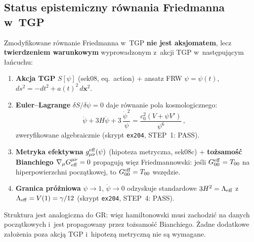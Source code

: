 \subsection{Status epistemiczny r\'ownania Friedmanna w~TGP}
\label{ssec:friedmann-status}

\begin{uwaga}
\label{rem:friedmann-conditional}
Zmodyfikowane r\'ownanie Friedmanna w~TGP \textbf{nie jest aksjomatem},
lecz \textbf{twierdzeniem warunkowym} wyprowadzonym z~akcji TGP
w~nast\k{e}puj\k{a}cym \l{}a\'ncuchu:
\begin{enumerate}[nosep]
  \item \textbf{Akcja TGP} $S[\psi]$ (sek08, eq.~action) + ansatz FRW
    $\psi = \psi(t)$, $ds^2 = -dt^2 + a(t)^2\,d\mathbf{x}^2$.
  \item \textbf{Euler--Lagrange} $\delta S/\delta\psi = 0$ daje
    r\'ownanie pola kosmologicznego:
    \begin{equation}
      \ddot\psi + 3H\dot\psi + 3\,\frac{\dot\psi^2}{\psi}
      = \frac{c_0^2(V + \psi V')}{\psi^6}\,,
      \label{eq:psi-cosmo-unified}
    \end{equation}
    zweryfikowane algebraicznie (skrypt \texttt{ex204}, STEP~1: PASS).
  \item \textbf{Metryka efektywna} $g_{\mu\nu}^{\rm eff}(\psi)$
    (hipoteza metryczna, sek08c) + \textbf{to\.zsamo\'s\'c Bianchiego}
    $\nabla_\mu G^{\mu\nu}_{\rm eff} = 0$ propaguj\k{a} wi\k{e}z
    Friedmannowski:
    je\'sli $G_{00}^{\rm eff} = T_{00}$ na hiperpowierzchni pocz\k{a}tkowej,
    to $G_{00}^{\rm eff} = T_{00}$ wsz\k{e}dzie.
  \item \textbf{Granica pr\'o\.zniowa} $\psi \to 1$, $\dot\psi \to 0$
    odzyskuje standardowe $3H^2 = \Lambda_{\rm eff}$ z
    $\Lambda_{\rm eff} = V(1) = \gamma/12$
    (skrypt \texttt{ex204}, STEP~4: PASS).
\end{enumerate}
Struktura jest analogiczna do GR: wi\k{e}z hamiltonowski musi
zachodzi\'c na danych pocz\k{a}tkowych i~jest propagowany przez
to\.zsamo\'s\'c Bianchiego. \.Zadne dodatkowe za\l{}o\.zenia
poza akcj\k{a} TGP i~hipotez\k{a} metryczn\k{a} nie s\k{a} wymagane.
\end{uwaga}
